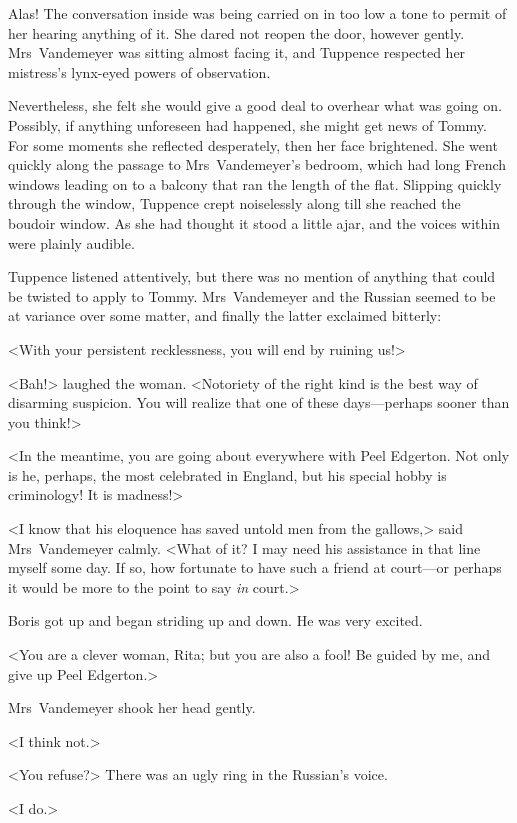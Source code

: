 Alas! The conversation inside was being carried on in too low a tone to permit of her hearing anything of it. She dared not reopen the door, however gently. Mrs~Vandemeyer was sitting almost facing it, and Tuppence respected her mistress's lynx-eyed powers of observation.

Nevertheless, she felt she would give a good deal to overhear what was going on. Possibly, if anything unforeseen had happened, she might get news of Tommy. For some moments she reflected desperately, then her face brightened. She went quickly along the passage to Mrs~Vandemeyer's bedroom, which had long French windows leading on to a balcony that ran the length of the flat. Slipping quickly through the window, Tuppence crept noiselessly along till she reached the boudoir window. As she had thought it stood a little ajar, and the voices within were plainly audible.

Tuppence listened attentively, but there was no mention of anything that could be twisted to apply to Tommy. Mrs~Vandemeyer and the Russian seemed to be at variance over some matter, and finally the latter exclaimed bitterly:

<With your persistent recklessness, you will end by ruining us!>

<Bah!> laughed the woman. <Notoriety of the right kind is the best way of disarming suspicion. You will realize that one of these days—perhaps sooner than you think!>

<In the meantime, you are going about everywhere with Peel Edgerton. Not only is he, perhaps, the most celebrated  in England, but his special hobby is criminology! It is madness!>

<I know that his eloquence has saved untold men from the gallows,> said Mrs~Vandemeyer calmly. <What of it? I may need his assistance in that line myself some day. If so, how fortunate to have such a friend at court—or perhaps it would be more to the point to say \emph{in} court.>

Boris got up and began striding up and down. He was very excited.

<You are a clever woman, Rita; but you are also a fool! Be guided by me, and give up Peel Edgerton.>

Mrs~Vandemeyer shook her head gently.

<I think not.>

<You refuse?> There was an ugly ring in the Russian's voice.

<I do.>

